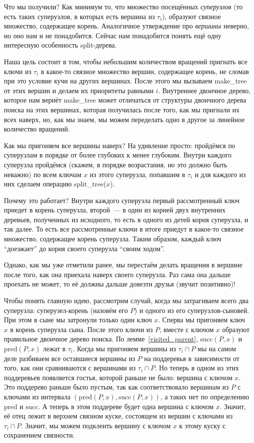 Что мы получили? Как минимум то, что множество посещённых \emph{суперузлов} (то есть таких суперузлов, в которых есть вершина из $\tau_i$), образуют связное множество, содержащее корень. Аналогичное утверждение про \emph{вершины} неверно, но оно нам и не понадобится. Сейчас нам понадобится понять ещё одну интересную особенность split-дерева.

Наша цель состоит в том, чтобы небольшим количеством вращений пригнать все
ключи из $\tau_i$ в какое-то связное множество вершин, содержащее корень,
не сломав при это условие кучи на других вершинах.
После этого мы вызываем \textrm{make\_tree} от этих вершин и делаем их приоритеты
равными $i$. Внутреннее двоичное дерево, которое нам вернёт \textrm{make\_tree}
может отличаться от структуры двоичного дерева поиска на этих вершинах, которая получилась после того, как мы пригнали их всех наверх, но, как мы знаем, мы можем переделать одно в другое за линейное количество вращений.

Как мы пригоняем все вершины наверх? На удивление просто: пройдёмся по суперузлам в порядке от более глубоких к менее глубоким. Внутри каждого суперузла пройдёмся (скажем, в порядке возрастания, но это должно быть неважно) по всем ключам $x$ из этого суперузла, попавшим в $\tau_i$ и для каждого из них сделаем операцию
\textrm{split\_tree}($x$).

Почему это работает? Внутри каждого суперузла первый рассмотренный ключ приедет в корень суперузла, второй~--- в один из корней двух внутренних деревьев, полученных из исходного, то есть в одного из детей корня суперузла, и так далее. То есть все рассмотренные ключи в итоге приедут в какое-то связное множество, содержащее корень суперузла. Таким образом, каждый ключ ``доезжает'' до корня своего суперузла ``своим ходом''.

Однако, как мы уже отметили ранее, мы перестаём делать вращения в вершине после того, как она приехала наверх своего суперузла. Раз сама она дальше проехать не может, то её должны
дальше довезти друзья (звучит позитивно)!

Чтобы понять главную идею, рассмотрим случай, когда мы затрагиваем всего два суперузла: суперузел-корень (назовём его $P$) и одного из его суперузлов-сыновей. При этом в сыне мы затронули только один ключ $x$. Сперва мы пригоняем ключ $x$ в корень суперузла сына.
После этого ключи из $P$, вместе с ключом $x$ образуют правильное двоичное дерево поиска.
По лемме~\ref{visited_parent}, $\mathrm{succ}(P, x)$ и $\mathrm{pred}(P, x)$ лежат в $\tau_i$. Когда мы пригоняем вершины из $\tau_i \cap P$ мы на самом деле разбиваем все оставшиеся вершины из $P$ на поддеревья в зависимости от того, как они сравниваются с вершинами из $\tau_i \cap P$. Но теперь в одном из этих поддеревьев появляется гостья, которой раньше не было: вершина с ключом $x$. Это поддерево раньше было пустым, так как соответствовало вершинам из $P$ с ключами из интервала $(\mathrm{pred}(P, x), \mathrm{succ}(P, x))$, а таких нет по определению $\mathrm{pred}$ и $\mathrm{succ}$. А теперь в этом поддереве будет одна вершина с ключом $x$. Значит, её отец лежит в верхнем связном куске, состоящем из вершин с ключами из $\tau_i \cap P$. Значит, мы можем подклеить вершину с ключом $x$ к этому куску с сохранением связности.

